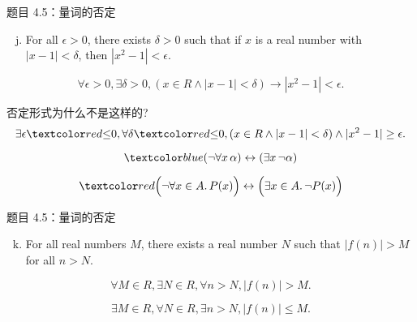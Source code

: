 \begin{frame}{}
  \begin{exampleblock}{题目 4.5：量词的否定}
    \begin{enumerate}[(a)]
      \setcounter{enumi}{9}
      \item For all $\epsilon > 0$, there exists $\delta > 0$ such that 
	if $x$ is a real number with $|x - 1| < \delta$, then $|x^2 - 1| < \epsilon$.
    \end{enumerate}
  \end{exampleblock}

  \vspace{0.50cm}
  \pause
  \[
    \forall \epsilon > 0, \exists \delta > 0, (x \in R \land |x - 1| < \delta) \to |x^2 - 1| < \epsilon.
  \]

  \vspace{0.30cm}
  \pause
  否定形式为什么不是这样的?
  \[
    \exists \epsilon \red{\le} 0, \forall \delta \red{\le} 0, (x \in R \land |x - 1| < \delta) \land |x^2 - 1| \ge \epsilon.
  \]

  \pause
  \vspace{-0.30cm}
  \[
    \blue{(\lnot \forall x\, \alpha) \leftrightarrow (\exists x\, \lnot \alpha)}
  \]
  
  \pause
  \vspace{-0.30cm}
  \[
    \red{\Big(\lnot \forall x \in A.\, P(x)\Big) \leftrightarrow \Big(\exists x \in A.\, \lnot P(x)\Big)}
  \]
\end{frame}

\begin{frame}{}
  \begin{exampleblock}{题目 4.5：量词的否定}
    \begin{enumerate}[(a)]
      \setcounter{enumi}{10}
      \item For all real numbers $M$, there exists a real number $N$ such that $|f(n)| > M$
	for all $n > N$.
    \end{enumerate}
  \end{exampleblock}

  \vspace{0.30cm}
  \[
    \forall M \in R, \exists N \in R, \forall n > N, |f(n)| > M.
  \]
  
  \pause
  \vspace{0.30cm}
  \[
    \exists M \in R, \forall N \in R, \exists n > N, |f(n)| \le M.
  \]
\end{frame}

